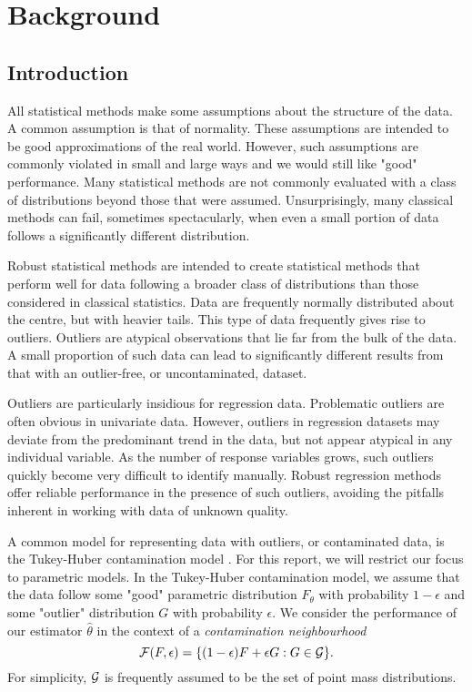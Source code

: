 

\section{Background}

\subsection{Introduction}
All statistical methods make some assumptions about the structure of the data. A common assumption is that of normality. These assumptions are intended to be good approximations of the real world. However, such assumptions are commonly violated in small and large ways and we would still like "good" performance. Many statistical methods are not commonly evaluated with a class of distributions beyond those that were assumed. Unsurprisingly, many classical methods can fail, sometimes spectacularly, when even a small portion of data follows a significantly different distribution.

Robust statistical methods are intended to create statistical methods that perform well for data following a broader class of distributions than those considered in classical statistics. Data are frequently normally distributed about the centre, but with heavier tails. This type of data frequently gives rise to outliers. Outliers are atypical observations that lie far from the bulk of the data. A small proportion of such data can lead to significantly different results from that with an outlier-free, or uncontaminated, dataset. 

Outliers are particularly insidious for regression data. Problematic outliers are often obvious in univariate data. However, outliers in regression datasets may deviate from the predominant trend in the data, but not appear atypical in any individual variable. As the number of response variables grows, such outliers quickly become very difficult to identify manually. Robust regression methods offer reliable performance in the presence of such outliers, avoiding the pitfalls inherent in working with data of unknown quality.

A common model for representing data with outliers, or contaminated data, is the Tukey-Huber contamination model \cite{alqallaf2009propagation}. For this report, we will restrict our focus to parametric models. In the Tukey-Huber contamination model, we assume that the data follow some "good" parametric distribution $F_\theta$ with probability $1-\epsilon$ and some "outlier" distribution $G$ with probability $\epsilon$. We consider the performance of our estimator $\hat \theta$ in the context of a \textit{contamination neighbourhood}
\begin{equation}
\label{eq:contamNeigh}
    \mathcal{F}(F,\epsilon) = \{ (1-\epsilon)F + \epsilon G : G \in \mathcal{G} \}.
\end{equation}
For simplicity, $\mathcal{G}$ is frequently assumed to be the set of point mass distributions.

